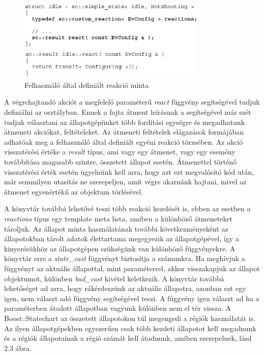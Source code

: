 \documentclass[a4paper,12pt]{report}
\begin{document}
\begin{figure}[hbtp]
\centering
\includegraphics[width=0.8\textwidth]{stcr.png}
\caption{Felhasználó által definiált reakció minta}
\label{fig:stsfl}
\end{figure}

A végrehajtandó akciót a megfelelő paraméterű {\it react} függvény segítségével tudjuk definiálni az osztályban.
Ennek a fajta átment leírásnak a segítségével már szét tudjuk választani az állapotgépünket több fordítási egységre és megadhatunk átmeneti akciókat, feltételeket. Az átmeneti feltételek elágazások formájában adhatóak meg a felhasználó által definiált egyéni reakció törzsében. Az akció visszatérési értéke a {\it result} típus, ami vagy egy átmenet, vagy egy esemény továbbítása magasabb szintre, összetett állapot esetén. Átmenettel történő visszatérési érték esetén ügyelnünk kell arra, hogy azt ezt megvalósító kód után, már semmilyen utasítás ne szerepeljen, amit végre akarnánk hajtani, mivel az átmenet egyenértékű az objektum törlésével. 

A könyvtár továbbá lehetővé teszi több reakció kezelését is, ebben az esetben a {\it reactions} típus egy template meta lista, amiben a különböző átmeneteket tároljuk. Az állapot minta használatának további következményeként az állapotokban tárolt adatok élettartama megegyezik az állapotgépével, így a kinyerésükhöz az állapotgépen szükségünk van különböző függvényekre. A könyvtár erre a {\it state\_cast} függvényt biztosítja a számunkra. Ha meghívjuk a függvényt az aktuális állapottal, mint paraméterrel, akkor visszakapjuk az állapot objektumot, különben {\it bad\_cast} kivétel keletkezik.
A könyvtár továbbá lehetőséget ad arra, hogy rákérdezzünk az aktuális állapotra, azonban ezt egy igen, nem választ adó függvény segítségével teszi. A függvény igen választ ad ha a paraméterben átadott állapotban vagyunk különben nem el tér vissza. A Boost::Statechart az összetett állapotokon túl megengedi a régiók használatát is. Az ilyen állapotgépekben egyszerűen csak több kezdeti állapotot kell megadnunk és a régiók állapotainak a régió számát kell átadnunk, amiben szerepelnek, lásd 2.3 ábra.
\end{document}
